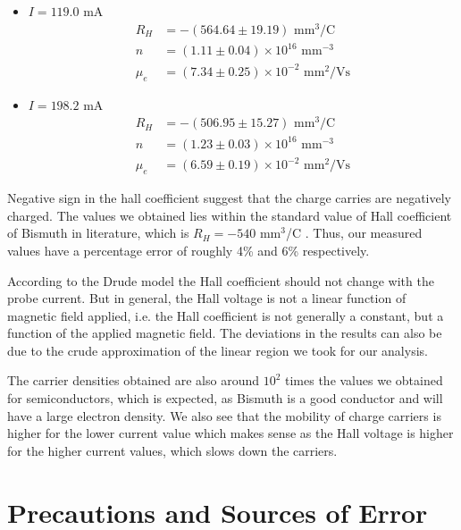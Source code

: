 \begin{itemize}
    \item $I=119.0$ mA
    \begin{align*}
        R_H &= - (564.64 \pm 19.19) \text{ mm}^3/\text{C}\\
        n &= (1.11 \pm 0.04) \times 10^{16} \text{ mm}^{-3}\\
        \mu_e &= (7.34 \pm 0.25) \times 10^{-2} \text{ mm}^2/\text{Vs}
    \end{align*}
    \item $I=198.2$ mA
    \begin{align*}
        R_H &= - (506.95 \pm 15.27) \text{ mm}^3/\text{C}\\
        n &= (1.23 \pm 0.03) \times 10^{16} \text{ mm}^{-3}\\
        \mu_e &= (6.59 \pm 0.19) \times 10^{-2} \text{ mm}^2/\text{Vs}
    \end{align*}
\end{itemize}

Negative sign in the hall coefficient suggest that the charge carries are negatively charged. The values we obtained lies within the standard value of Hall coefficient of Bismuth in literature, which is $R_H = -540 $ mm$^3$/C \cite{Kittel_2004,smat2017}. Thus, our measured values have a percentage error of roughly 4\% and 6\% respectively. 

According to the Drude model the Hall coefficient should not
change with the probe current. But in general, the
Hall voltage is not a linear function of magnetic field applied, i.e.
the Hall coefficient is not generally a constant, but a function of the applied magnetic field. The deviations in the results can also be due to the crude approximation of the linear region we took for our analysis.

The carrier densities obtained are also around $10^2$ times the values we obtained for semiconductors, which is expected, as Bismuth is a good conductor and will have a large electron density.
We also see that the mobility of charge carriers is higher for the
lower current value which makes sense as the Hall voltage is higher for the higher current values, which slows down the carriers. \vspace{-1em}

\section{Precautions and Sources of Error}

